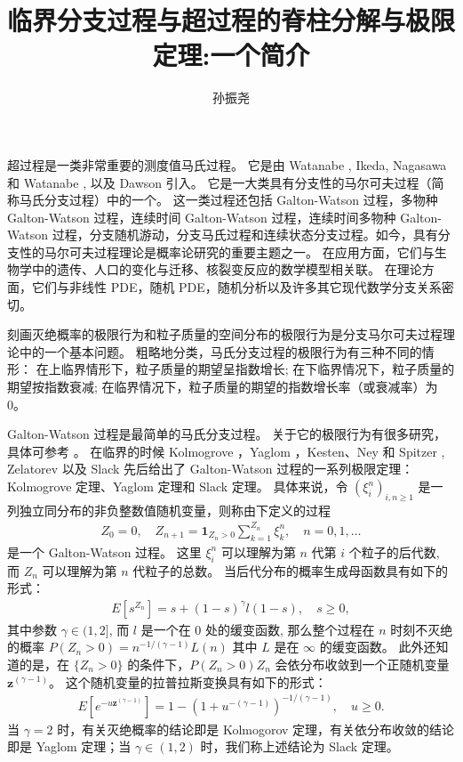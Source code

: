 \documentclass[12pt,a4paper]{amsart}
\numberwithin{equation}{section}
\theoremstyle{plain}
\theoremstyle{definition}
\begin{document}
\title
[一个简介]
{临界分支过程与超过程的脊柱分解与极限定理:一个简介}
\author
[孙振尧]
{孙振尧}
\maketitle
超过程是一类非常重要的测度值马氏过程。
它是由 Watanabe \cite{Watanabe1968Limit}, Ikeda, Nagasawa 和 Watanabe \cite{IkedaNagasawaWatanabe1968Branchinga,IkedaNagasawaWatanabe1968Branching,IkedaNagasawaWatanabe1969Branching}, 以及 Dawson \cite{Dawson1975Stochastic,Dawson1977Critical}引入。
它是一大类具有分支性的马尔可夫过程（简称马氏分支过程）中的一个。    
这一类过程还包括 Galton-Watson 过程，多物种 Galton-Watson 过程，连续时间 Galton-Watson 过程，连续时间多物种 Galton-Watson 过程，分支随机游动，分支马氏过程和连续状态分支过程。如今，具有分支性的马尔可夫过程理论是概率论研究的重要主题之一。
在应用方面，它们与生物学中的遗传、人口的变化与迁移、核裂变反应的数学模型相关联。
在理论方面，它们与非线性 PDE，随机 PDE，随机分析以及许多其它现代数学分支关系密切。

刻画灭绝概率的极限行为和粒子质量的空间分布的极限行为是分支马尔可夫过程理论中的一个基本问题。
粗略地分类，马氏分支过程的极限行为有三种不同的情形：
在上临界情形下，粒子质量的期望呈指数增长; 
在下临界情况下，粒子质量的期望按指数衰减; 
在临界情况下，粒子质量的期望的指数增长率（或衰减率）为0。

Galton-Watson 过程是最简单的马氏分支过程。
关于它的极限行为有很多研究，具体可参考 \cite{AthreyaNey1972Branching}。 
在临界的时候 Kolmogrove \cite{Kolmogorov1938Zur}，Yaglom \cite{Yaglom1947Certain}，Kesten、Ney 和 Spitzer \cite{KestenNeySpitzer1966GaltonWatson}, Zelatorev \cite{Zolotarev1957More} 以及 Slack \cite{Slack1968Branching} 先后给出了 Galton-Watson 过程的一系列极限定理： Kolmogrove 定理、Yaglom 定理和 Slack 定理。
具体来说，令 $(\xi_i^n)_{i,n \geq 1}$ 是一列独立同分布的非负整数值随机变量，则称由下定义的过程
\begin{align}
Z_0 = 0, 
\quad 
Z_{n+1} = \mathbf 1_{Z_n > 0} \sum_{k=1}^{Z_n} \xi_k^n, \quad n=0,1,\dots
\end{align}
是一个 Galton-Watson 过程。
这里 $\xi_i^n$ 可以理解为第 $n$ 代第 $i$ 个粒子的后代数, 而 $Z_n$ 可以理解为第 $n$ 代粒子的总数。
当后代分布的概率生成母函数具有如下的形式：
\begin{align}
E[s^{Z_n}]
= s + (1-s)^\gamma l(1-s),
\quad s\geq 0,
\end{align}
其中参数 $\gamma \in (1,2]$, 而 $l$ 是一个在 $0$ 处的缓变函数,  那么整个过程在 $n$ 时刻不灭绝的概率 $P(Z_n > 0) = n^{-1/(\gamma - 1)} L(n)$ 其中 $L$ 是在 $\infty$ 的缓变函数。
此外还知道的是，在 $\{Z_n > 0\}$ 的条件下，$P(Z_n > 0) Z_n$ 会依分布收敛到一个正随机变量 $\mathbf z^{(\gamma - 1)}$。
这个随机变量的拉普拉斯变换具有如下的形式：
\begin{align}
  E\left[ e^{-u \mathbf z^{(\gamma - 1)}} \right]
= 1 - (1+ u^{-(\gamma - 1)})^{-1/(\gamma - 1)},
\quad u\geq 0.
\end{align}
当 $\gamma =2$ 时，有关灭绝概率的结论即是 Kolmogorov 定理，有关依分布收敛的结论即是 Yaglom 定理；当 $\gamma \in (1,2)$ 时，我们称上述结论为 Slack 定理。
\end{document}
